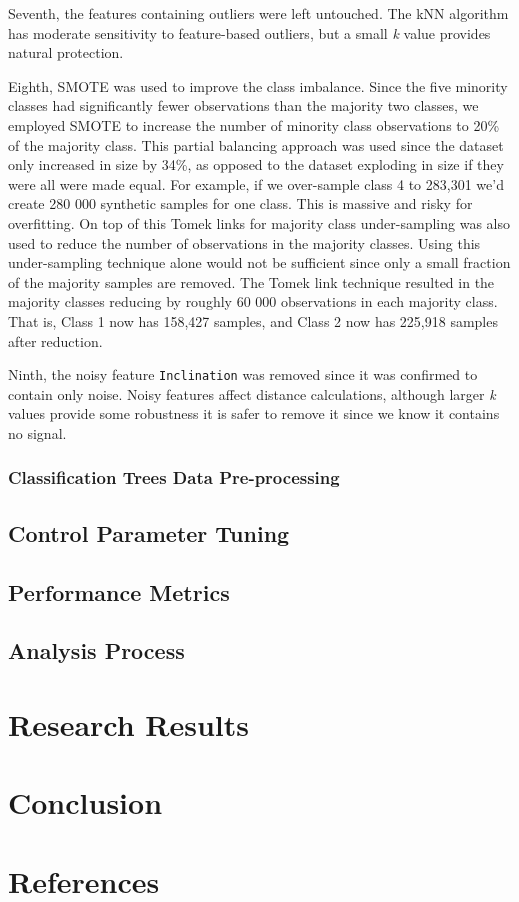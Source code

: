 \documentclass[conference]{IEEEtran}
\begin{document}
 Seventh, the features containing outliers were left untouched. The kNN algorithm has moderate sensitivity to feature-based outliers, but a small \textit{k} value provides natural protection.
 
 Eighth, SMOTE was used to improve the class imbalance. Since the five minority classes had significantly fewer observations than the majority two classes, we employed SMOTE to increase the number of minority class observations to 20\% of the majority class. This partial balancing approach was used since the dataset only increased in size by 34\%, as opposed to the dataset exploding in size if they were all were made equal. For example, if we over-sample class 4 to 283,301 we'd create 280 000 synthetic samples for one class. This is massive and risky for overfitting. On top of this Tomek links for majority class under-sampling was also used to reduce the number of observations in the majority classes. Using this under-sampling technique alone would not be sufficient since only a small fraction of the majority samples are removed. The Tomek link technique resulted in the majority classes reducing by roughly 60 000 observations in each majority class. That is, Class 1 now has 158,427 samples, and Class 2 now has 225,918 samples after reduction.
 
 Ninth, the noisy feature \texttt{Inclination} was removed since it was confirmed to contain only noise. Noisy features affect distance calculations, although larger \textit{k} values provide some robustness it is safer to remove it since we know it contains no signal.

\subsubsection{Classification Trees Data Pre-processing}
\subsection{Control Parameter Tuning}

\subsection{Performance Metrics}

\subsection{Analysis Process}

\section{Research Results}
\section{Conclusion}
\section*{References}



\end{document}
